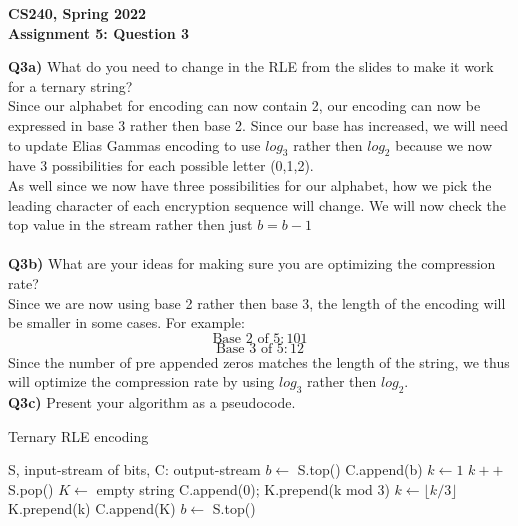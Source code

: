 \documentclass[12pt]{article}
\begin{document}
\begin{center}
{\Large\textbf{CS240, Spring 2022}}\\
\vspace{2mm}
{\Large\textbf{Assignment 5: Question 3}}\\
\vspace{3mm}
\end{center}

\begin{adjustwidth}{0em}{0pt}
\textbf{Q3a)} What do you need to change in the RLE from the slides to make it work for a ternary string?\\
Since our alphabet for encoding can now contain 2, our encoding can now be expressed in base 3 rather then base 2. Since our base has increased, we will need to update Elias Gammas encoding to use $log_3$ rather then $log_2$ because we now have 3 possibilities for each possible letter (0,1,2).\\
As well since we now have three possibilities for our alphabet, how we pick the leading character of each encryption sequence will change. We will now check the top value in the stream rather then just $b=b-1$\\\\
\textbf{Q3b)} What are your ideas for making sure you are optimizing the compression rate? \\
Since we are now using base 2 rather then base 3, the length of the encoding will be smaller in some cases. For example:
\[ \text{Base 2 of 5}: 101 \]
\[ \text{Base 3 of 5}: 12 \]
Since the number of pre appended zeros matches the length of the string, we thus will optimize the compression rate by using $log_3$ rather then $log_2$.\\
\textbf{Q3c)} Present your algorithm as a pseudocode.
\begin{algorithm}
\caption{Ternary RLE encoding}
\begin{algorithmic} 
\REQUIRE S, input-stream of bits, C: output-stream
\STATE $b \leftarrow$ S.top()
\STATE C.append(b)
\STATE $k \leftarrow 1$
\STATE $k++$
\STATE S.pop()
\ENDWHILE
\STATE $K \leftarrow$ empty string
\STATE C.append(0);
\STATE K.prepend(k mod 3)
\STATE $k \leftarrow \lfloor k/3 \rfloor$
\ENDWHILE
\STATE K.prepend(k)
\STATE C.append(K)
\STATE $b \leftarrow$ S.top()
\ENDWHILE
\end{algorithmic}
\end{algorithm}
\end{adjustwidth} 
\end{document}
